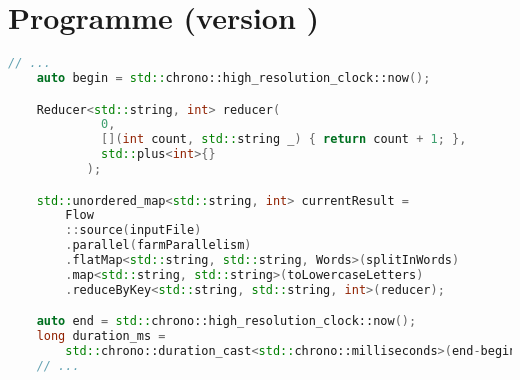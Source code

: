\newpage
\section{Programme  (version \ppff)}
\begin{lstlisting}[gobble=4,basicstyle=\ttfamily\footnotesize,language=c++]
    // ...
    auto begin = std::chrono::high_resolution_clock::now();

    Reducer<std::string, int> reducer(
             0, 
             [](int count, std::string _) { return count + 1; },
             std::plus<int>{}
           );

    std::unordered_map<std::string, int> currentResult = 
        Flow
        ::source(inputFile)
        .parallel(farmParallelism)
        .flatMap<std::string, std::string, Words>(splitInWords)			
        .map<std::string, std::string>(toLowercaseLetters)			
        .reduceByKey<std::string, std::string, int>(reducer);  

    auto end = std::chrono::high_resolution_clock::now();
    long duration_ms = 
        std::chrono::duration_cast<std::chrono::milliseconds>(end-begin).count();
    // ...
\end{lstlisting}

\newpage
